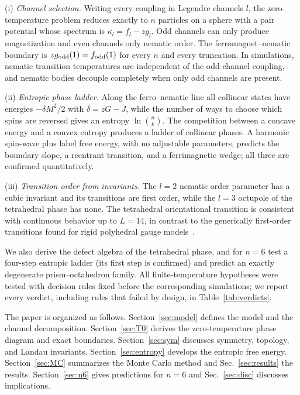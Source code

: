 \documentclass[pre,twocolumn,superscriptaddress,amsmath,amssymb,floatfix]{revtex4-2}
\begin{document}
(i) \emph{Channel selection.} Writing every coupling in Legendre channels $l$, the zero-temperature problem reduces exactly to $n$ particles on a sphere with a pair potential whose spectrum is $\kappa_l=f_l-zg_l$. Odd channels can only produce magnetization and even channels only nematic order. The ferromagnet--nematic boundary is $zg_{\rm odd}(1)=f_{\rm odd}(1)$ for every $n$ and every truncation. In simulations, nematic transition temperatures are independent of the odd-channel coupling, and nematic bodies decouple completely when only odd channels are present.

(ii) \emph{Entropic phase ladder.} Along the ferro--nematic line all collinear states have energies $-\delta M^2/2$ with $\delta=zG-J$, while the number of ways to choose which spins are reversed gives an entropy $\ln\binom{n}{k}$. The competition between a concave energy and a convex entropy produces a ladder of collinear phases. A harmonic spin-wave plus label free energy, with no adjustable parameters, predicts the boundary slope, a reentrant transition, and a ferrimagnetic wedge; all three are confirmed quantitatively.

(iii) \emph{Transition order from invariants.} The $l=2$ nematic order parameter has a cubic invariant and its transitions are first order, while the $l=3$ octupole of the tetrahedral phase has none. The tetrahedral orientational transition is consistent with continuous behavior up to $L=14$, in contrast to the generically first-order transitions found for rigid polyhedral gauge models~\cite{LiuGreitemannPollet2018}.

We also derive the defect algebra of the tetrahedral phase, and for $n=6$ test a four-step entropic ladder (its first step is confirmed) and predict an exactly degenerate prism--octahedron family. All finite-temperature hypotheses were tested with decision rules fixed before the corresponding simulations; we report every verdict, including rules that failed by design, in Table~\ref{tab:verdicts}.

The paper is organized as follows. Section~\ref{sec:model} defines the model and the channel decomposition. Section~\ref{sec:T0} derives the zero-temperature phase diagram and exact boundaries. Section~\ref{sec:sym} discusses symmetry, topology, and Landau invariants. Section~\ref{sec:entropy} develops the entropic free energy. Section~\ref{sec:MC} summarizes the Monte Carlo method and Sec.~\ref{sec:results} the results. Section~\ref{sec:n6} gives predictions for $n=6$ and Sec.~\ref{sec:disc} discusses implications.
\end{document}
